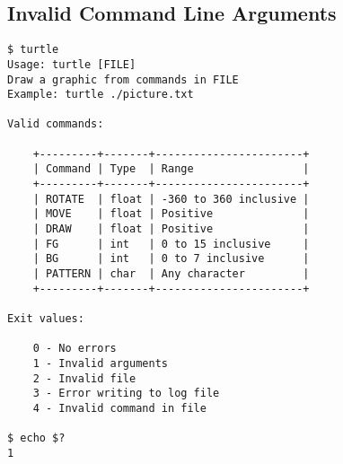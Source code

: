 \documentclass[a4paper, 12pt, titlepage]{article}
\begin{document}
\subsection{Invalid Command Line Arguments}

\begin{lstlisting}
$ turtle
Usage: turtle [FILE]
Draw a graphic from commands in FILE
Example: turtle ./picture.txt

Valid commands:

    +---------+-------+-----------------------+
    | Command | Type  | Range                 |
    +---------+-------+-----------------------+
    | ROTATE  | float | -360 to 360 inclusive |
    | MOVE    | float | Positive              |
    | DRAW    | float | Positive              |
    | FG      | int   | 0 to 15 inclusive     |
    | BG      | int   | 0 to 7 inclusive      |
    | PATTERN | char  | Any character         |
    +---------+-------+-----------------------+

Exit values:

    0 - No errors
    1 - Invalid arguments
    2 - Invalid file
    3 - Error writing to log file
    4 - Invalid command in file

$ echo $?
1
\end{lstlisting}

\newpage
\end{document}
